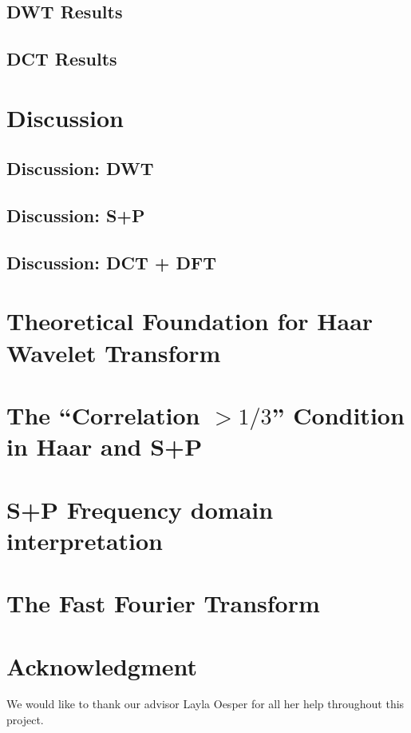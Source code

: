 \documentclass[conference]{IEEEtran}
\begin{document}
\subsection{DWT Results}
\label{resultssec:DWT}


\subsection{DCT Results}
\label{resultssec:DCT}




\label{resultssec:SP}

\section{Discussion}
\label{sec:discussion}

\label{discussionsec:Collective}


\label{discussionsec:DWT}
\subsection{Discussion: DWT}


\label{discussionsec:sp}
\subsection{Discussion: S+P}


\label{discussionsec:fourier}
\subsection{Discussion: DCT + DFT}




\appendices
\section{Theoretical Foundation for Haar Wavelet Transform}
\label{apx:haartheory}

\section{The ``Correlation $> 1/3$'' Condition in Haar and S+P}

\section{S+P Frequency domain interpretation}

\section{The Fast Fourier Transform}
\label{apx:fft}

\section*{Acknowledgment}
We would like to thank our advisor Layla Oesper for all her help throughout this project.


\end{document}
